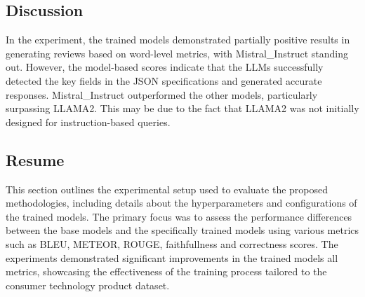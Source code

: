 \subsection{Discussion}
In the experiment, the trained models demonstrated partially positive results in generating reviews based on word-level metrics, with Mistral\_Instruct standing out. However, the model-based scores indicate that the LLMs successfully detected the key fields in the JSON specifications and generated accurate responses. Mistral\_Instruct outperformed the other models, particularly surpassing LLAMA2. This may be due to the fact that LLAMA2 was not initially designed for instruction-based queries.

\subsection{Resume}
This section outlines the experimental setup used to evaluate the proposed methodologies, including details about the hyperparameters and configurations of the trained models. The primary focus was to assess the performance differences between the base models and the specifically trained models using various metrics such as BLEU, METEOR, ROUGE, faithfullness and correctness scores. The experiments demonstrated significant improvements in the trained models all metrics, showcasing the effectiveness of the training process tailored to the consumer technology product dataset.